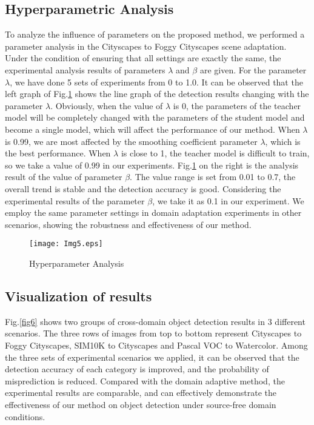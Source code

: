 \documentclass[sn-mathphys]{sn-jnl}%
\theoremstyle{thmstyleone}%
\theoremstyle{thmstyletwo}%
\theoremstyle{thmstylethree}%
\begin{document}
\subsection{Hyperparametric Analysis}
To analyze the influence of parameters on the proposed method, we performed a parameter analysis in the Cityscapes to Foggy Cityscapes scene adaptation. Under the condition of ensuring that all settings are exactly the same, the experimental analysis results of parameters $\lambda$ and $\beta $ are given. For the parameter $\lambda$, we have done 5 sets of experiments from 0 to 1.0. It can be observed that the left graph of Fig.\ref{fig5} shows the line graph of the detection results changing with the parameter $\lambda$. Obviously, when the value of $\lambda$ is 0, the parameters of the teacher model will be completely changed with the parameters of the student model and become a single model, which will affect the performance of our method. When $\lambda$ is 0.99, we are most affected by the smoothing coefficient parameter $\lambda$, which is the best performance. When $\lambda$ is close to 1, the teacher model is difficult to train, so we take a value of 0.99 in our experiments. Fig.\ref{fig5} on the right is the analysis result of the value of parameter $\beta$. The value range is set from 0.01 to 0.7, the overall trend is stable and the detection accuracy is good. Considering the experimental results of the parameter $\beta $, we take it as 0.1 in our experiment. We employ the same parameter settings in domain adaptation experiments in other scenarios, showing the robustness and effectiveness of our method.

\begin{figure}
	
	\texttt{[image: Img5.eps]}
	\caption{Hyperparameter Analysis} \label{fig5}
\end{figure}
%
%
\subsection{Visualization of results}

Fig.\ref{fig6} shows two groups of cross-domain object detection results in 3 different scenarios. The three rows of images from top to bottom represent Cityscapes to Foggy Cityscapes, SIM10K to Cityscapes and Pascal VOC to Watercolor. Among the three sets of experimental scenarios we applied, it can be observed that the detection accuracy of each category is improved, and the probability of misprediction is reduced. Compared with the domain adaptive method, the experimental results are comparable, and can effectively demonstrate the effectiveness of our method on object detection under source-free domain conditions.
\end{document}

